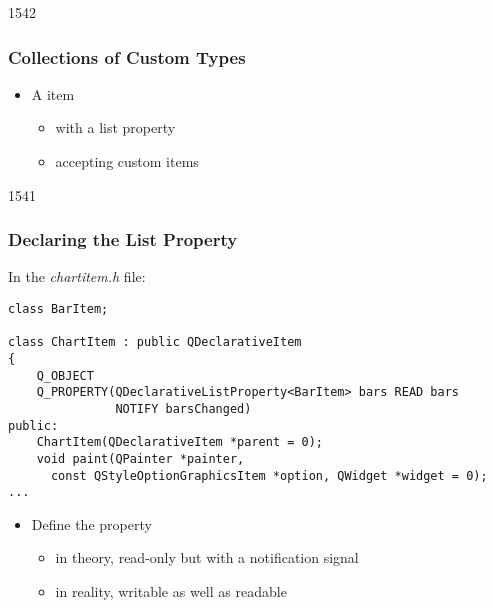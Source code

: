 \begin{slide}[fragile]{1542}\frametitle{Collections of Custom Types}


\begin{itemize}
\item A  item
  \begin{itemize}
  \item with a  list property
  \item accepting custom  items
  \end{itemize}
\end{itemize}

\end{slide}

\begin{slide}[fragile]{1541}\frametitle{Declaring the List Property}

In the \textit{chartitem.h} file:

\vspace*{0.5em}
\begin{lstlisting}
class BarItem;

class ChartItem : public QDeclarativeItem
{
    Q_OBJECT
    Q_PROPERTY(QDeclarativeListProperty<BarItem> bars READ bars
               NOTIFY barsChanged)
public:
    ChartItem(QDeclarativeItem *parent = 0);
    void paint(QPainter *painter,
      const QStyleOptionGraphicsItem *option, QWidget *widget = 0);
...
\end{lstlisting}

\vspace*{0.5em}
\begin{itemize}
\item Define the  property
  \begin{itemize}
  \item in theory, read-only but with a notification signal
  \item in reality, writable as well as readable
  \end{itemize}
\end{itemize}

\end{slide}

